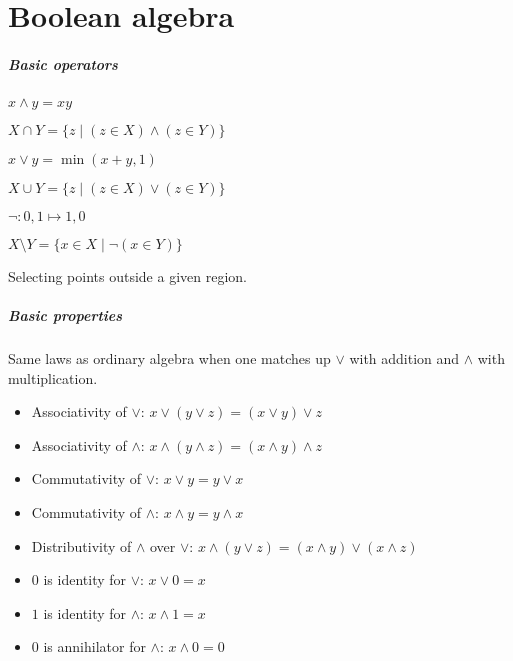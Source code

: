 \section{Boolean algebra}
\subparagraph{Basic operators}
\begin{definition}[Conjonction]
	$x \land y = xy$
\end{definition}
\begin{definition}[Intersection]
	$X \cap Y = \{ z \mid (z \in X) \land (z \in Y) \}$
\end{definition}
\begin{definition}[Disjunction]
	$x \lor y = \min(x+y,1)$
\end{definition}
\begin{definition}[Union]
	$X \cup Y = \{ z \mid (z \in X) \lor (z \in Y) \}$
\end{definition}
\begin{definition}[Negation]
	$\lnot: 0,1 \mapsto 1,0$
\end{definition}
\begin{definition}
	$X \setminus Y = \{ x \in X \mid \lnot (x \in Y) \}$
\end{definition}
\begin{question}
	Selecting points outside a given region.
\end{question}
\subparagraph{Basic properties}
\begin{property}
	Same laws as ordinary algebra when one matches up $\lor$ with addition and $\land$ with multiplication.
	\begin{itemize}
		\item Associativity of $\lor$: $x \lor (y \lor z) = (x \lor y) \lor z$
		\item Associativity of $\land$: $x \land (y \land z) = (x \land y) \land z$
		\item Commutativity of $\lor$: $x \lor y  = y \lor x$
		\item Commutativity of $\land$: $x \land y  = y \land x$
		\item Distributivity of $\land$ over $\lor$:  $x \land (y \lor z) = (x \land y) \lor (x \land z)$
		\item $0$ is identity for $\lor$: $x \lor 0  = x$
		\item $1$ is identity for $\land$: $x \land 1  = x$
		\item $0$ is annihilator for $\land$: $x \land 0  = 0$
	\end{itemize}
\end{property}

